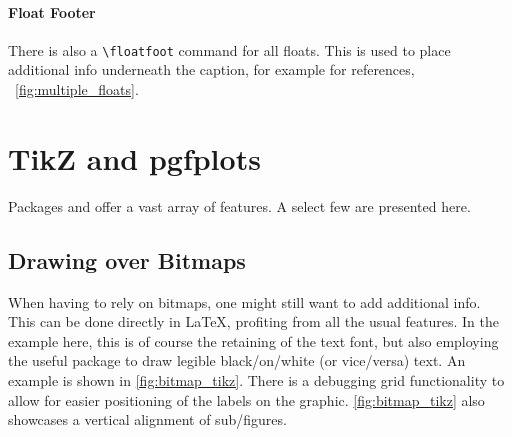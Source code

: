 \paragraph{Float Footer}
There is also a \verb|\floatfoot| command for all floats.
This is used to place additional info underneath the caption, for example for
references, \ \cref{fig:multiple_floats}.

\section{TikZ and pgfplots}
Packages  and  offer a vast array of features.
A select few are presented here.

\subsection{Drawing over Bitmaps}

When having to rely on bitmaps, one might still want to add additional info.
This can be done directly in \LaTeX{}, profiting from all the usual features.
In the example here, this is of course the retaining of the text font, but also
employing the useful  package to draw legible black\-/on\-/white
(or vice\-/versa) text.
An example is shown in \cref{fig:bitmap_tikz}.
There is a debugging grid functionality to allow for easier positioning of the labels
on the graphic.
\cref{fig:bitmap_tikz} also showcases a vertical alignment of sub\-/figures.

